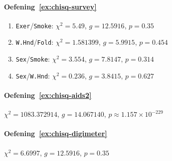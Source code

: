 \paragraph{Oefening~\ref{ex:chisq-survey}}

\begin{enumerate}
  \item \texttt{Exer}/\texttt{Smoke}: $\chi^2 = 5.49$, $g = 12.5916$, $p = 0.35$
  \item \texttt{W.Hnd}/\texttt{Fold}: $\chi^2 = 1.581399$, $g = 5.9915$, $p = 0.454$
  \item \texttt{Sex}/\texttt{Smoke}: $\chi^2 = 3.554$, $g = 7.8147$, $p = 0.314$
  \item \texttt{Sex}/\texttt{W.Hnd}: $\chi^2 = 0.236$, $g = 3.8415$, $p = 0.627$
\end{enumerate}

\paragraph{Oefening~\ref{ex:chisq-aids2}} $\chi^2 = 1083.372914$, $g = 14.067140$, $p \approx 1.157 \times 10^{-229}$

\paragraph{Oefening~\ref{ex:chisq-digimeter}} $\chi^2 = 6.6997$, $g = 12.5916$, $p = 0.35$
